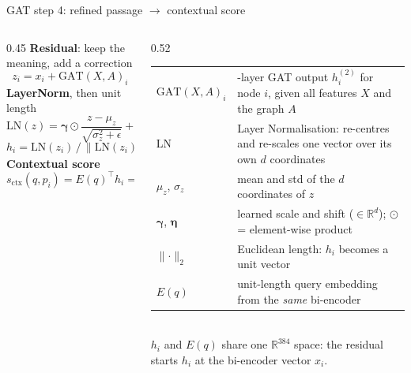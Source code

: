 \documentclass[aspectratio=169,11pt]{beamer}
\makeatletter
\newcommand{\gloss}[1]{\begingroup\footnotesize\renewcommand{\arraystretch}{1.18}\begin{tabular}{@{}>{\color{ctx}}l@{\hspace{0.6em}}>{\raggedright\arraybackslash}p{#1}@{}}}
\newcommand{\glossend}{\end{tabular}\endgroup}
\newcommand{\sctx}{s_{\mathrm{ctx}}}
\makeatother
\begin{document}
\begin{frame}{GAT step 4: refined passage $\to$ contextual score}
\begin{columns}[T]
\begin{column}{0.45\textwidth}
\textbf{Residual}: keep the meaning, add a correction
\[z_i=x_i+\mathrm{GAT}(X,A)_i\]
\textbf{LayerNorm}, then unit length
\[\mathrm{LN}(z)=\boldsymbol\gamma\odot\frac{z-\mu_z}{\sqrt{\sigma_z^2+\epsilon}}+\boldsymbol\eta\]
\[h_i=\mathrm{LN}(z_i)\,/\,\lVert\mathrm{LN}(z_i)\rVert_2\]
\textbf{Contextual score}
\[\sctx(q,p_i)=E(q)^{\!\top}h_i=\cos\big(E(q),h_i\big)\]
\end{column}
\begin{column}{0.52\textwidth}
\gloss{4.7cm}
$\mathrm{GAT}(X,A)_i$ & 2-layer GAT output $h^{(2)}_i$ for node $i$, given all features $X$ and the graph $A$\\
LN & Layer Normalisation: re-centres and re-scales one vector over its own $d$ coordinates\\
$\mu_z$, $\sigma_z$ & mean and std of the $d$ coordinates of $z$\\
$\boldsymbol\gamma$, $\boldsymbol\eta$ & learned scale and shift ($\in\mathbb R^d$); $\odot$ = element-wise product\\
$\lVert\cdot\rVert_2$ & Euclidean length: $h_i$ becomes a unit vector\\
$E(q)$ & unit-length query embedding from the \emph{same} bi-encoder\\
\glossend\\[0.1cm]
{\small $h_i$ and $E(q)$ share one $\mathbb R^{384}$ space: the residual starts $h_i$ at the bi-encoder vector $x_i$.}
\end{column}
\end{columns}
\end{frame}
\end{document}
